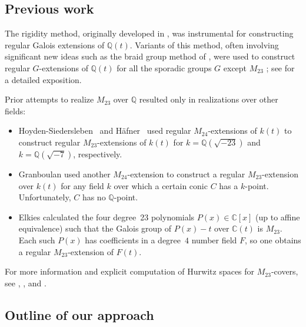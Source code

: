 \documentclass[12pt,reqno]{amsart}
\newcommand{\C}{\mathbb{C}}
\newcommand{\Q}{\mathbb{Q}}
\theoremstyle{definition}
\theoremstyle{remark}
\begin{document}
\subsection{Previous work}
\label{S:previous}

The rigidity method, originally developed in \cite{Shih1974,Fried1977,Belyi1979,Matzat1979,Matzat1984,Matzat1985a,Thompson1984},
was instrumental for constructing regular Galois extensions of $\Q(t)$.
Variants of this method, often involving significant new ideas such as the braid group method of \cite{Matzat1989,Matzat1991,Fried-Voelklein1991}, were used to construct regular $G$-extensions of $\Q(t)$ for all the sporadic groups $G$ except $M_{23}$ \cite{Thompson1984,Matzat1985a,Hoyden-Siedersleben1985, Hunt1986, Hoyden-Siedersleben-Matzat1986, Matzat-Zeh-Marschke1986, Matzat-Zeh-Marschke1987, Malle88,
Pahlings1988,Pahlings1989}; see \cite[II.9]{Malle-Matzat2018} for a detailed exposition.

Prior attempts to realize $M_{23}$ over $\Q$ resulted only in realizations over other fields:
\begin{itemize}
\item Hoyden-Siedersleben~\cite{Hoyden-Siedersleben1985} and H\"afner~\cite{Haefner1987} used regular $M_{24}$-extensions of $k(t)$ to construct regular $M_{23}$-extensions of $k(t)$ for $k=\Q(\sqrt{-23})$ and $k=\Q(\sqrt{-7})$, respectively.
\item Granboulan \cite{Granboulan1996} used another $M_{24}$-extension to construct a regular $M_{23}$-extension over $k(t)$ for any field $k$ over which a certain conic $C$ has a $k$-point.
Unfortunately, $C$ has no $\Q$-point.
\item Elkies \cite{Elkies2013} calculated the four degree~23 polynomials $P(x) \in \C[x]$ (up to affine equivalence) such that the Galois group of $P(x)-t$ over $\C(t)$ is $M_{23}$.
Each such $P(x)$ has coefficients in a degree~$4$ number field $F$, 
so one obtains a regular $M_{23}$-extension of $F(t)$.
\end{itemize}
For more information and explicit computation of Hurwitz spaces for $M_{23}$-covers, see \cite{Koenig2014}, \cite{Haefner-preprint}, and \cite{Seguin25}.

\subsection{Outline of our approach}
\end{document}
